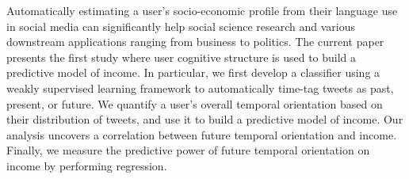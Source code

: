 Automatically estimating a user's socio-economic profile from their language use in social media can significantly help social science research and various downstream applications ranging from business to politics. The current paper presents the first study where user cognitive structure is used to build a predictive model of income. In particular, we first develop a classifier using a weakly supervised learning framework to automatically time-tag tweets as past, present, or future. We quantify a user's overall temporal orientation based on their distribution of tweets, and use it to build a predictive model of income. Our analysis uncovers a correlation between future temporal orientation and income. Finally, we measure the predictive power of future temporal orientation on income by performing regression.
